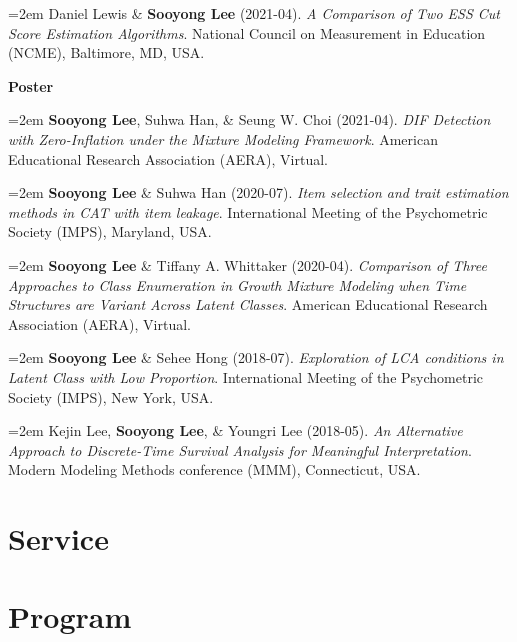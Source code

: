 \documentclass[11pt,letterpaper,]{awesome-me}
\begin{document}
\hangindent=2em  Daniel Lewis \& \textbf{Sooyong Lee}
(2021-04). \emph{A Comparison of Two ESS Cut Score Estimation
Algorithms}. National Council on Measurement in Education (NCME),
Baltimore, MD, USA.

\setlength{\leftskip}{0cm}

\textbf{Poster}

\setlength{\leftskip}{0.5cm}

\hangindent=2em  \textbf{Sooyong Lee}, Suhwa Han, \& Seung
W. Choi (2021-04). \emph{DIF Detection with Zero-Inflation under the
Mixture Modeling Framework}. American Educational Research Association
(AERA), Virtual.

\hangindent=2em  \textbf{Sooyong Lee} \& Suhwa Han
(2020-07). \emph{Item selection and trait estimation methods in CAT with
item leakage}. International Meeting of the Psychometric Society (IMPS),
Maryland, USA.

\hangindent=2em  \textbf{Sooyong Lee} \& Tiffany A.
Whittaker (2020-04). \emph{Comparison of Three Approaches to Class
Enumeration in Growth Mixture Modeling when Time Structures are Variant
Across Latent Classes}. American Educational Research Association
(AERA), Virtual.

\hangindent=2em  \textbf{Sooyong Lee} \& Sehee Hong
(2018-07). \emph{Exploration of LCA conditions in Latent Class with Low
Proportion}. International Meeting of the Psychometric Society (IMPS),
New York, USA.

\hangindent=2em  Kejin Lee, \textbf{Sooyong Lee}, \& Youngri
Lee (2018-05). \emph{An Alternative Approach to Discrete-Time Survival
Analysis for Meaningful Interpretation}. Modern Modeling Methods
conference (MMM), Connecticut, USA.

\setlength{\leftskip}{0cm}

\hypertarget{service}{%
\section{Service}\label{service}}

\begin{cventries}  \end{cventries}

\hypertarget{program}{%
\section{Program}\label{program}}
\end{document}

